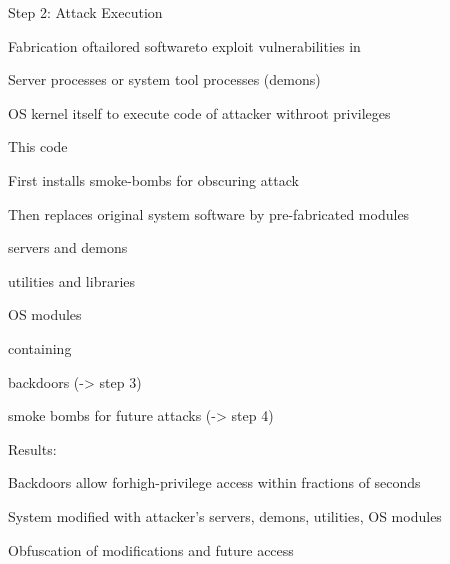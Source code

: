 \documentclass[a4paper]{article}
\begin{document}
\begin{multicols}{3}
    Step 2: Attack Execution
    \begin{itemize*}
        \item Fabrication oftailored softwareto exploit vulnerabilities in
              \begin{itemize*}
                  \item Server processes or system tool processes (demons)
                  \item OS kernel itself
                        to execute code of attacker withroot privileges
              \end{itemize*}
        \item This code
              \begin{itemize*}
                  \item First installs smoke-bombs for obscuring attack
                  \item Then replaces original system software by pre-fabricated modules
                        \begin{itemize*}
                            \item servers and demons
                            \item utilities and libraries
                            \item OS modules
                        \end{itemize*}
                  \item containing
                        \begin{itemize*}
                            \item backdoors (->  step 3)
                            \item smoke bombs for future attacks (->  step 4)
                        \end{itemize*}
              \end{itemize*}
        \item Results:
              \begin{itemize*}
                  \item Backdoors allow forhigh-privilege access within fractions of seconds
                  \item System modified with attacker’s servers, demons, utilities, OS modules
                  \item Obfuscation of modifications and future access
              \end{itemize*}
    \end{itemize*}


\end{multicols}
\end{document}
